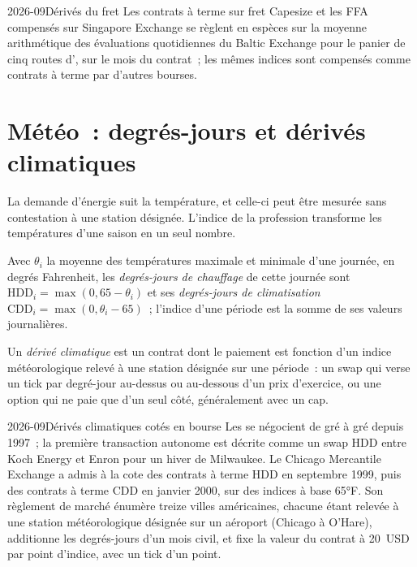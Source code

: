 \begin{dated}{2026-09}{Dérivés du fret}\label{dat:m3:freight-weather-and-other-corners:ffa}
Les contrats à terme sur fret Capesize et les FFA compensés sur Singapore Exchange se règlent en espèces sur la
moyenne arithmétique des évaluations quotidiennes du Baltic Exchange pour le panier de cinq routes d', sur
le mois du contrat~; les mêmes indices sont compensés comme contrats à terme par d'autres bourses.
\end{dated}

\section{Météo~: degrés-jours et dérivés climatiques}

La demande d'énergie suit la température, et celle-ci peut être mesurée sans contestation à une
station désignée. L'indice de la profession transforme les températures d'une saison en un seul nombre.

\begin{definition}\label{def:m3:freight-weather-and-other-corners:dd}
Avec $\theta_i$ la moyenne des températures maximale et minimale d'une journée, en degrés Fahrenheit, les
\emph{degrés-jours de chauffage} de cette journée sont $\mathrm{HDD}_i = \max(0, 65 - \theta_i)$
et ses \emph{degrés-jours de climatisation} $\mathrm{CDD}_i = \max(0, \theta_i - 65)$~;
l'indice d'une période est la somme de ses valeurs journalières.
\end{definition}

\begin{definition}\label{def:m3:freight-weather-and-other-corners:wd}
Un \emph{dérivé climatique} est un contrat dont le paiement est fonction
d'un indice météorologique relevé à une station désignée sur une période~: un swap qui verse un tick par degré-jour au-dessus ou au-dessous
d'un prix d'exercice, ou une option qui ne paie que d'un seul côté, généralement avec un cap.
\end{definition}

\begin{dated}{2026-09}{Dérivés climatiques cotés en bourse}\label{dat:m3:freight-weather-and-other-corners:cme}
Les  se négocient de gré à gré depuis 1997~; la première transaction autonome est décrite
comme un swap HDD entre Koch Energy et Enron pour un hiver de Milwaukee. Le Chicago Mercantile Exchange a admis à la cote des contrats à terme HDD
en septembre 1999, puis des contrats à terme CDD en janvier 2000, sur des indices à base 65°F. Son règlement de marché énumère treize
villes américaines, chacune étant relevée à une station météorologique désignée sur un aéroport (Chicago à O'Hare), additionne les degrés-jours d'un mois civil, et
fixe la valeur du contrat à 20~USD par point d'indice, avec un tick d'un point.
\end{dated}


